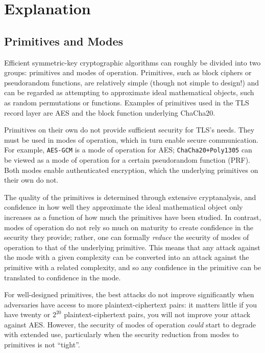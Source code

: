 \documentclass{article}
\begin{document}
\section{Explanation}\label{sec:explanation}

\subsection{Primitives and Modes}
Efficient symmetric-key cryptographic algorithms can roughly be divided into two groups: primitives and modes of operation. Primitives, such as block ciphers or pseudorandom functions, are relatively simple (though not simple to design!) and can be regarded as attempting to approximate ideal mathematical objects, such as random permutations or functions. Examples of primitives used in the TLS record layer are AES and the block function underlying ChaCha20. 

Primitives on their own do not provide sufficient security for TLS's needs. They must be used in modes of operation, which in turn enable secure communication. For example, \texttt{AES-GCM} is a mode of operation for AES; \texttt{ChaCha20+Poly1305} can be viewed as a mode of operation for a certain pseudorandom function (PRF). Both modes enable authenticated encryption, which the underlying primitives on their own do not.

The quality of the primitives is determined through extensive cryptanalysis, and confidence in how well they approximate the ideal mathematical object only increases as a function of how much the primitives have been studied. In contrast, modes of operation do not rely so much on maturity to create confidence in the security they provide; rather, one can formally \emph{reduce} the security of modes of operation to that of the underlying primitive. This means that any attack against the mode with a given complexity can be converted into an attack against the primitive with a related complexity, and so any confidence in the primitive can be translated to confidence in the mode.

For well-designed primitives, the best attacks do not improve significantly when adversaries have access to more plaintext-ciphertext pairs: it matters little if you have twenty or $2^{20}$ plaintext-ciphertext pairs, you will not improve your attack against AES. However, the security of modes of operation \emph{could} start to degrade with extended use, particularly when the security reduction from modes to primitives is not ``tight''.
\end{document}
